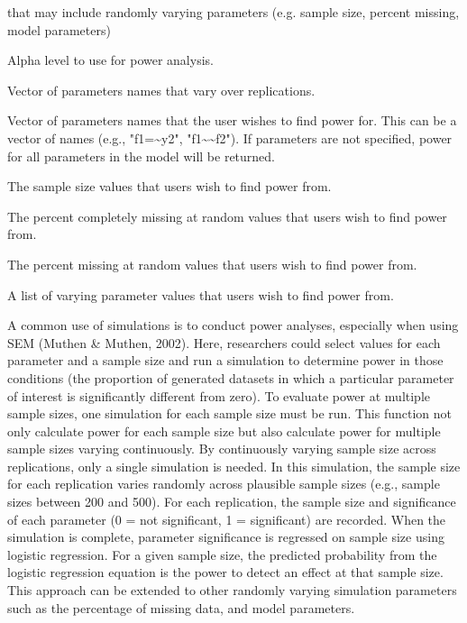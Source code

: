 \documentclass[a4paper]{book}
\begin{document}
\begin{Arguments}
\begin{ldescription}
\item[\code{simResult}] 
 that may include randomly varying parameters (e.g. sample size, percent missing, model parameters)

\item[\code{alpha}] 
Alpha level to use for power analysis.

\item[\code{contParam}] 
Vector of parameters names that vary over replications.

\item[\code{powerParam}] 
Vector of parameters names that the user wishes to find power for. This can be a vector of names (e.g., "f1=\textasciitilde{}y2", "f1\textasciitilde{}\textasciitilde{}f2"). If parameters are not specified, power for all parameters in the model will be returned.

\item[\code{nVal}] 
The sample size values that users wish to find power from.

\item[\code{pmMCARval}] 
The percent completely missing at random values that users wish to find power from.

\item[\code{pmMARval}] 
The percent missing at random values that users wish to find power from.

\item[\code{paramVal}] 
A list of varying parameter values that users wish to find power from.

\end{ldescription}
\end{Arguments}
%
\begin{Details}\relax
A common use of simulations is to conduct power analyses, especially when using SEM (Muthen \& Muthen, 2002). Here, researchers could select values for each parameter and a sample size and run a simulation to determine power in those conditions (the proportion of generated datasets in which a particular parameter of interest is significantly different from zero). To evaluate power at multiple sample sizes, one simulation for each sample size must be run. This function not only calculate power for each sample size but also calculate power for multiple sample sizes varying continuously. By continuously varying sample size across replications, only a single simulation is needed. In this simulation, the sample size for each replication varies randomly across plausible sample sizes (e.g., sample sizes between 200 and 500). For each replication, the sample size and significance of each parameter (0 = not significant, 1 = significant) are recorded. When the simulation is complete, parameter significance is regressed on sample size using logistic regression. For a given sample size, the predicted probability from the logistic regression equation is the power to detect an effect at that sample size. This approach can be extended to other randomly varying simulation parameters such as the percentage of missing data, and model parameters.
\end{Details}
\end{document}
